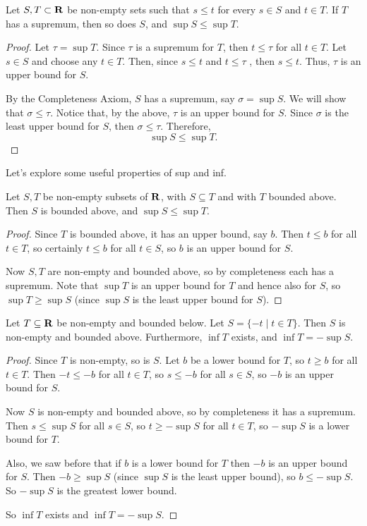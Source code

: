 \begin{theorem}
Let $S, T \subset \mathbf R$ be non-empty sets such that $s \le t$ for every $s \in S$ and $t \in T$. If $T$ has a supremum, then so does $S$, and $\sup S \le \sup T$.
\end{theorem}

\begin{proof}
Let $\tau = \sup T$. Since $\tau$ is a supremum for $T$, then $t \le \tau$ for all $t \in T$. Let $s \in S$ and choose any $t \in T$. Then, since $s \le t$ and $t \le \tau$ , then $s \le t$. Thus, $\tau$ is an upper bound for $S$. 

By the Completeness Axiom, $S$ has a supremum, say $\sigma = \sup S$. We will show that $\sigma \le \tau$. Notice that, by the above, $\tau$ is an upper bound for $S$. Since $\sigma$ is the least upper bound for $S$, then $\sigma \le \tau$. Therefore,
\[\sup S \le \sup T.\]
\end{proof}

Let's explore some useful properties of sup and inf.

\begin{proposition}
Let $S, T$ be non-empty subsets of $\mathbf R$, with $S \subseteq T$ and with $T$ bounded above. Then $S$ is bounded above, and $\sup S \le \sup T$.
\end{proposition}
\begin{proof}
Since $T$ is bounded above, it has an upper bound, say $b$. Then $t \le b$ for all $t \in T$, so certainly $t \le b$ for all $t \in S$, so $b$ is an upper bound for $S$.

Now $S, T$ are non-empty and bounded above, so by completeness each has a supremum. Note that $\sup T$ is an upper bound for $T$ and hence also for $S$, so $\sup T \ge \sup S$ (since $\sup S$ is the least upper bound for $S$).
\end{proof}

\begin{proposition}
Let $T \subseteq \mathbf R$ be non-empty and bounded below. Let $S = \{-t \mid t \in T\}$. Then $S$ is non-empty and bounded above. Furthermore, $\inf T$ exists, and $\inf T = -\sup S$.
\end{proposition}
\begin{proof}
Since $T$ is non-empty, so is $S$. Let $b$ be a lower bound for $T$, so $t \ge b$ for all $t \in T$. Then $-t \le -b$ for all $t \in T$, so $s \le -b$ for all $s \in S$, so $-b$ is an upper
bound for $S$.

Now $S$ is non-empty and bounded above, so by completeness it has a
supremum. Then $s \le \sup S$ for all $s \in S$, so $t \ge -\sup S$ for all $t \in T$, so $-\sup S$ is a lower bound for $T$.

Also, we saw before that if $b$ is a lower bound for $T$ then $-b$ is an upper bound for $S$. Then $-b \ge \sup S$ (since $\sup S$ is the least upper bound), so $b \le -\sup S$. So $-\sup S$ is the greatest lower bound.

So $\inf T$ exists and $\inf T = -\sup S$.
\end{proof}

